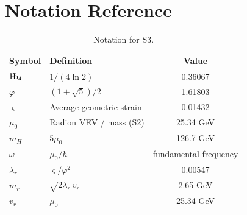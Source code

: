 \documentclass[11pt,a4paper]{article}
\theoremstyle{definition}
\theoremstyle{remark}
\newcommand{\Hb}{\textnormal{H\kern-0.3em b}}
\newcommand{\Hbfour}{\Hb_4}
\newcommand{\strain}{\varsigma}
\newcommand{\gr}{\varphi}
\newcommand{\murad}{\mu_0}
\newcommand{\mH}{m_H}
\begin{document}
\section{Notation Reference}
\label{sec:notation}

\begin{table}[H]
\centering
\begin{tabular}{llc}
\toprule
\textbf{Symbol} & \textbf{Definition} & \textbf{Value} \\
\midrule
$\Hbfour$ & $1/(4\ln 2)$ & 0.36067 \\
$\gr$ & $(1+\sqrt{5})/2$ & 1.61803 \\
$\strain$ & Average geometric strain & 0.01432 \\
$\murad$ & Radion VEV / mass (S2) & 25.34 GeV \\
$\mH$ & $5\murad$ & 126.7 GeV \\
$\omega$ & $\murad/\hbar$ & fundamental frequency \\
$\lambda_r$ & $\strain/\gr^2$ & 0.00547 \\
$m_r$ & $\sqrt{2\lambda_r}\,v_r$ & 2.65 GeV \\
$v_r$ & $\murad$ & 25.34 GeV \\
\bottomrule
\end{tabular}
\caption{Notation for S3.}
\label{tab:notation}
\end{table}




\end{document}
